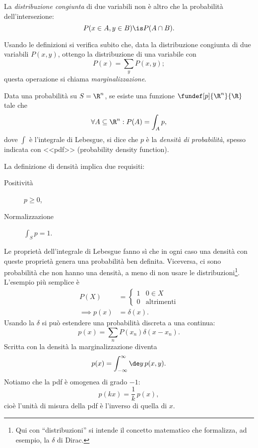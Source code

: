 \begin{definition}
	La \emph{distribuzione congiunta} di due variabili non è altro che
	la probabilità dell'intersezione:
	\begin{equation*}
		P(x\in A,y\in B)
		\is P(A\cap B).
	\end{equation*}
\end{definition}

\begin{definition}[Marginalizzazione]
	Usando le definizioni si verifica subito che, data la distribuzione congiunta di due variabili $P(x,y)$,
	ottengo la distribuzione di una variabile con
	\begin{equation*}
		P(x) = \sum_y P(x,y);
	\end{equation*}
	questa operazione si chiama \emph{marginalizzazione}.
\end{definition}

\begin{definition}
	Data una probabilità su $S=\R^n$, se esiste una funzione $\fundef[p]{\R^n}{\R}$ tale che
	\begin{equation*}
		\forall A\subseteq\R^n : P(A) = \int_A p,
	\end{equation*}
	dove $\int$ è l'integrale di Lebesgue,
	si dice che $p$ è la \emph{densità di probabilità},
	spesso indicata con <<pdf>> (probability density function).
\end{definition}

La definizione di densità implica due requisiti:
\begin{description}
	\item[Positività] $p \ge 0$,
	\item[Normalizzazione] $\int_S p = 1$.
\end{description}
Le proprietà dell'integrale di Lebesgue fanno sì che in ogni caso una densità con queste proprietà genera una probabilità ben definita.
Viceversa, ci sono probabilità che non hanno una densità, a meno di non usare le distribuzioni\footnote{Qui con ``distribuzioni'' si intende il concetto matematico che formalizza, ad esempio, la $\delta$ di Dirac.}.
L'esempio più semplice è
\begin{align*}
	P(X) &= \begin{cases}
		1 & 0 \in X \\
		0 & \text{altrimenti}
	\end{cases} \\
	\implies p(x) &= \delta(x).
\end{align*}
Usando la $\delta$ si può estendere una probabilità discreta a una continua:
\begin{equation*}
	p(x) = \sum_n P(x_n)\delta(x-x_n).
\end{equation*}
Scritta con la densità la marginalizzazione diventa
\begin{equation*}
	p(x) = \int_{-\infty}^\infty \de y\,p(x,y).
\end{equation*}
Notiamo che la pdf è omogenea di grado $-1$:
\begin{equation*}
	p(kx) = \frac1k\, p(x),
\end{equation*}
cioè l'unità di misura della pdf è l'inverso di quella di $x$.

